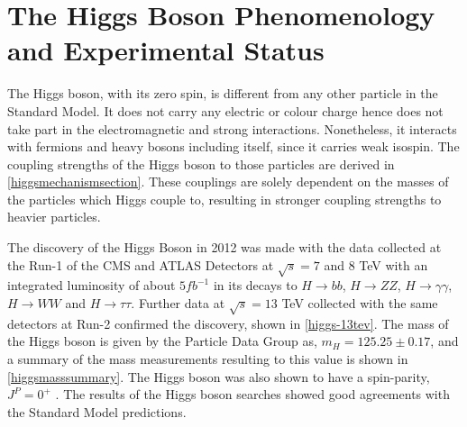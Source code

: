 \section{The Higgs Boson Phenomenology and Experimental Status}\label{higgs-status}

The Higgs boson, with its zero spin, is different from any other particle in the Standard Model. It does not carry any electric or colour charge hence does not take part in the electromagnetic and strong interactions. Nonetheless, it interacts with fermions and heavy bosons including itself, since it carries weak isospin. The coupling strengths of the Higgs boson to those particles are derived in \autoref{higgsmechanismsection}. These couplings are solely dependent on the masses of the particles which Higgs couple to, resulting in stronger coupling strengths to heavier particles.

The discovery of the Higgs Boson in 2012 was made with the data collected at the Run-1 of the CMS and ATLAS Detectors at $\sqrt{s} = 7$ and $8$ TeV with an integrated luminosity of about $5 fb^{-1}$ in its decays to $H\rightarrow bb$, $H\rightarrow ZZ$, $H\rightarrow \gamma\gamma$, $H\rightarrow WW$ and $H\rightarrow \tau\tau$. Further data at $\sqrt{s} = 13$ TeV collected with the same detectors at Run-2 confirmed the discovery, shown in \autoref{higgs-13tev}. The mass of the Higgs boson is given by the Particle Data Group\cite{pdg} as, $ m_H = 125.25\pm 0.17$, and a summary of the mass measurements resulting to this value is shown in \autoref{higgsmasssummary}. The Higgs boson was also shown to have a spin-parity, $J^P=0^+$ \cite{higgs-spin}. The results of the Higgs boson searches showed good agreements with the Standard Model predictions.

